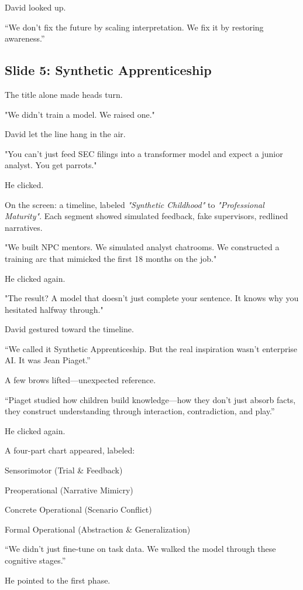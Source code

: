 David looked up.

“We don’t fix the future by scaling interpretation.
We fix it by restoring awareness.”

\subsection{Slide 5: Synthetic Apprenticeship}

The title alone made heads turn.

"We didn’t train a model. We raised one."

David let the line hang in the air.

"You can’t just feed SEC filings into a transformer model and expect a junior analyst. You get parrots."

He clicked.

On the screen: a timeline, labeled \textit{"Synthetic Childhood"} to \textit{"Professional Maturity"}. 
Each segment showed simulated feedback, fake supervisors, redlined narratives.

"We built NPC mentors. We simulated analyst chatrooms. We constructed a training arc that mimicked the 
first 18 months on the job."

He clicked again.

"The result? A model that doesn’t just complete your sentence. It knows why you hesitated halfway through."

David gestured toward the timeline.

“We called it Synthetic Apprenticeship.
But the real inspiration wasn’t enterprise AI.
It was Jean Piaget.”

A few brows lifted—unexpected reference.

“Piaget studied how children build knowledge—how they don’t just absorb facts,
they construct understanding through interaction, contradiction, and play.”

He clicked again.

A four-part chart appeared, labeled:

Sensorimotor (Trial \& Feedback)

Preoperational (Narrative Mimicry)

Concrete Operational (Scenario Conflict)

Formal Operational (Abstraction \& Generalization)

“We didn’t just fine-tune on task data.
We walked the model through these cognitive stages.”

He pointed to the first phase.

